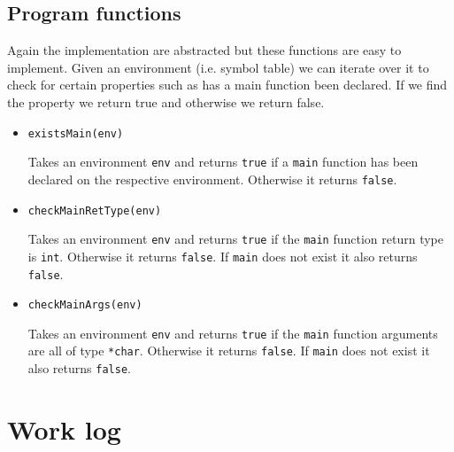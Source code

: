 \documentclass{article}
\begin{document}
\subsection{Program functions}
Again the implementation are abstracted but these functions are easy to implement. Given an environment (i.e. symbol table) we can iterate over it to check for certain properties such as has a main function been declared. If we find the property we return true and otherwise we return false.
\begin{itemize}
\item \verb|existsMain(env)|
\begin{sloppypar}
Takes an environment \verb|env| and returns \verb|true| if a \verb|main| function has been declared on the respective environment. Otherwise it returns \verb|false|.
\end{sloppypar}
\item \verb|checkMainRetType(env)|
\begin{sloppypar}
Takes an environment \verb|env| and returns \verb|true| if the \verb|main| function return type is \verb|int|. Otherwise it returns \verb|false|. If \verb|main| does not exist it also returns \verb|false|.
\end{sloppypar}
\item \verb|checkMainArgs(env)|
\begin{sloppypar}
Takes an environment \verb|env| and returns \verb|true| if the \verb|main| function arguments are all of type \verb|*char|. Otherwise it returns \verb|false|. If \verb|main| does not exist it also returns \verb|false|.
\end{sloppypar}
\end{itemize}

\section{Work log}
\end{document}
